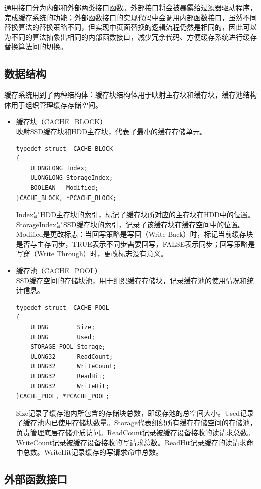 通用接口分为内部和外部两类接口函数。外部接口将会被暴露给过滤器驱动程序，完成缓存系统的功能；外部函数接口的实现代码中会调用内部函数接口，虽然不同替换算法的替换策略不同，但实现中页面替换的逻辑流程仍然是相同的，因此可以为不同的算法抽象出相同的内部函数接口，减少冗余代码、方便缓存系统进行缓存替换算法间的切换。

\subsection{数据结构}

缓存系统用到了两种结构体：缓存块结构体用于映射主存块和缓存块，缓存池结构体用于组织管理缓存存储空间。

\begin{itemize}

\item 缓存块（CACHE\_BLOCK）
\\映射SSD缓存块和HDD主存块，代表了最小的缓存存储单元。
\begin{lstlisting}
typedef struct _CACHE_BLOCK
{
    ULONGLONG Index;
    ULONGLONG StorageIndex;
    BOOLEAN   Modified;
}CACHE_BLOCK, *PCACHE_BLOCK;
\end{lstlisting}
Index是HDD主存块的索引，标记了缓存块所对应的主存块在HDD中的位置。StorageIndex是SSD缓存块的索引，记录了该缓存块在缓存空间中的位置。Modified是更改标志：当回写策略是写回（Write Back）时，标记当前缓存块是否与主存同步，TRUE表示不同步需要回写，FALSE表示同步；回写策略是写穿（Write Through）时，更改标志没有意义。

\item 缓存池（CACHE\_POOL）
\\SSD缓存空间的存储块池，用于组织缓存存储块，记录缓存池的使用情况和统计信息。
\begin{lstlisting}
typedef struct _CACHE_POOL
{
    ULONG        Size;
    ULONG        Used;
    STORAGE_POOL Storage;
    ULONG32      ReadCount;
    ULONG32      WriteCount;
    ULONG32      ReadHit;
    ULONG32      WriteHit;
}CACHE_POOL, *PCACHE_POOL;
\end{lstlisting}
Size记录了缓存池内所包含的存储块总数，即缓存池的总空间大小。Used记录了缓存池内已使用存储块数量。Storage代表组织所有缓存存储空间的存储池，负责管理底层存储介质访问。ReadCount记录被缓存设备接收的读请求总数。WriteCount记录被缓存设备接收的写请求总数。ReadHit记录缓存的读请求命中总数。WriteHit记录缓存的写请求命中总数。

\end{itemize}

\subsection{外部函数接口}

